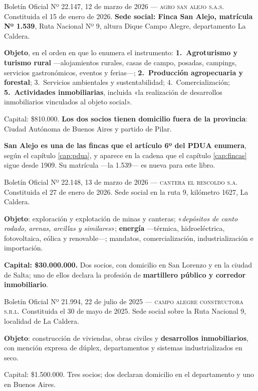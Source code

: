 \begin{ficha}{Boletín Oficial Nº 22.147, 12 de marzo de 2026 --- \textsc{agro san alejo s.a.s.}}
Constituida el 15 de enero de 2026. \textbf{Sede social: Finca San Alejo, matrícula Nº 1.539},
Ruta Nacional Nº 9, altura Dique Campo Alegre, departamento La Caldera.

\textbf{Objeto}, en el orden en que lo enumera el instrumento: \textbf{1.\ Agroturismo y turismo
rural} ---alojamientos rurales, casas de campo, posadas, campings, servicios gastronómicos,
eventos y ferias---; \textbf{2.\ Producción agropecuaria y forestal}; 3.\ Servicios ambientales
y sustentabilidad; 4.\ Comercialización; \textbf{5.\ Actividades inmobiliarias}, incluida «la
realización de desarrollos inmobiliarios vinculados al objeto social».

Capital: \$810.000. \textbf{Los dos socios tienen domicilio fuera de la provincia}: Ciudad
Autónoma de Buenos Aires y partido de Pilar.
\end{ficha}

\textbf{San Alejo es una de las fincas que el artículo 6º del PDUA enumera}, según el capítulo
\ref{cap:pdua}, y aparece en la cadena que el capítulo \ref{cap:fincas} sigue desde 1909. Su
matrícula ---la 1.539--- es nueva para este libro.

\begin{ficha}{Boletín Oficial Nº 22.148, 13 de marzo de 2026 --- \textsc{cantera el rescoldo s.a.}}
Constituida el 27 de enero de 2026. Sede social en la ruta 9, kilómetro 1627, La Caldera.

\textbf{Objeto}: exploración y explotación de minas y canteras; «\textit{depósitos de canto
rodado, arenas, arcillas y similares}»; \textbf{energía} ---térmica, hidroeléctrica,
fotovoltaica, eólica y renovable---; mandatos, comercialización, industrialización e
importación.

\textbf{Capital: \$30.000.000.} Dos socios, con domicilio en San Lorenzo y en la ciudad de
Salta; uno de ellos declara la profesión de \textbf{martillero público y corredor
inmobiliario}.
\end{ficha}

\begin{ficha}{Boletín Oficial Nº 21.994, 22 de julio de 2025 --- \textsc{campo alegre constructora s.r.l.}}
Constituida el 30 de mayo de 2025. Sede social sobre la Ruta Nacional 9, localidad de La
Caldera.

\textbf{Objeto}: construcción de viviendas, obras civiles y \textbf{desarrollos inmobiliarios},
con mención expresa de dúplex, departamentos y sistemas industrializados en seco.

Capital: \$1.500.000. Tres socios; dos declaran domicilio en el departamento y uno en Buenos
Aires.
\end{ficha}

